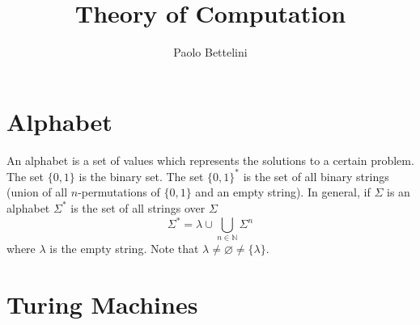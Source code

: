 \documentclass{article}
\title{Theory of Computation}
\author{Paolo Bettelini}
\date{}
\begin{document}
\maketitle
\tableofcontents
\pagebreak

\section{Alphabet}

An alphabet is a set of values which represents the solutions
to a certain problem. \\
The set \(\{0,1\}\) is the binary set. The set \(\{0,1\}^*\) is the set of
all binary strings (union of all \(n\)-permutations of \(\{0,1\}\) and an empty string).
In general, if \(\Sigma\) is an alphabet \(\Sigma^*\) is the set
of all strings over \(\Sigma\)
\[
    \Sigma^* = \lambda \cup \bigcup_{n\in\mathbb{N}} \Sigma^n
\]
where \(\lambda\) is the empty string.
Note that \(\lambda \neq \varnothing \neq \{\lambda\}\).
\section{Turing Machines}


\pagebreak
\end{document}
